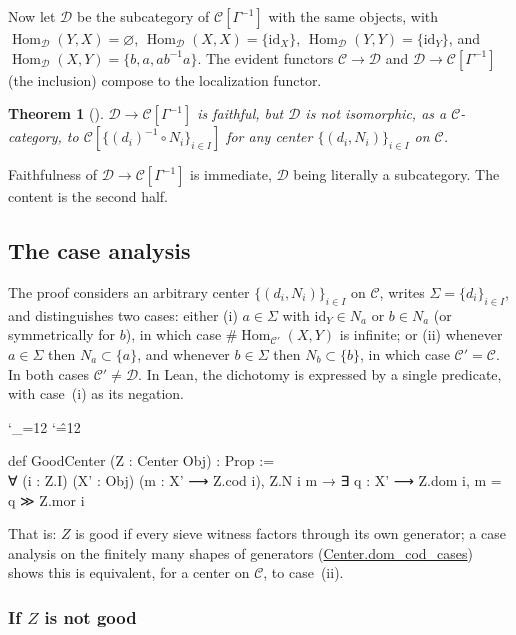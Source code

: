 \documentclass[11pt]{amsart}
\newcommand{\lc}[1]{\url{#1}}
\newenvironment{leancode}{%
  \begingroup
  \catcode`\_=12\relax
  \catcode`\^=12\relax
  \small\ttfamily\raggedright\baselineskip=1.15\baselineskip
  \par\smallskip\noindent
}{%
  \par\smallskip
  \endgroup
}
\theoremstyle{plain}
\newtheorem{theorem}{Theorem}[section]
\theoremstyle{definition}
\theoremstyle{remark}
\newcommand{\calC}{\mathcal C}
\newcommand{\calD}{\mathcal D}
\newcommand{\id}{\mathrm{id}}
\DeclareMathOperator{\Hom}{Hom}
\begin{document}
Now let $\calD$ be the subcategory of $\calC[\Gamma^{-1}]$ with the same objects, with
$\Hom_\calD(Y,X)=\varnothing$, $\Hom_\calD(X,X)=\{\id_X\}$, $\Hom_\calD(Y,Y)=\{\id_Y\}$, and
$\Hom_\calD(X,Y) = \{b,a,ab^{-1}a\}$. The evident functors $\calC \to \calD$ and
$\calD \to \calC[\Gamma^{-1}]$ (the inclusion) compose to the localization functor.

\begin{theorem}[{\citep[Fact~5.2]{Mayeux}}]
\label{thm:no-realizing-center}
$\calD \to \calC[\Gamma^{-1}]$ is faithful, but $\calD$ is not isomorphic, as a
$\calC$-category, to $\calC[\{(d_i)^{-1}\circ N_i\}_{i\in I}]$ for any center
$\{(d_i,N_i)\}_{i\in I}$ on $\calC$.
\end{theorem}

Faithfulness of $\calD \to \calC[\Gamma^{-1}]$ is immediate, $\calD$ being literally a
subcategory. The content is the second half.

\subsection{The case analysis}

The proof considers an arbitrary center $\{(d_i,N_i)\}_{i\in I}$ on $\calC$, writes
$\Sigma=\{d_i\}_{i\in I}$, and distinguishes two cases: either (i) $a \in \Sigma$ with
$\id_Y \in N_a$ or $b \in N_a$ (or symmetrically for $b$), in which case
$\#\Hom_{\calC'}(X,Y)$ is infinite; or (ii) whenever $a \in \Sigma$ then $N_a \subset \{a\}$,
and whenever $b\in\Sigma$ then $N_b \subset\{b\}$, in which case $\calC' = \calC$. In both
cases $\calC' \neq \calD$. In Lean, the dichotomy is expressed by a single predicate, with
case~(i) as its negation.

\begin{leancode}
def GoodCenter (Z : Center Obj) : Prop := \\
  ∀ (i : Z.I) (X' : Obj) (m : X' ⟶ Z.cod i), Z.N i m → ∃ q : X' ⟶ Z.dom i, m = q ≫ Z.mor i \\
\end{leancode}
That is: $Z$ is good if every sieve witness factors through its own generator; a case
analysis on the finitely many shapes of generators (\lc{Center.dom_cod_cases}) shows this
is equivalent, for a center on $\calC$, to case~(ii).

\subsubsection{If $Z$ is not good}
\end{document}
